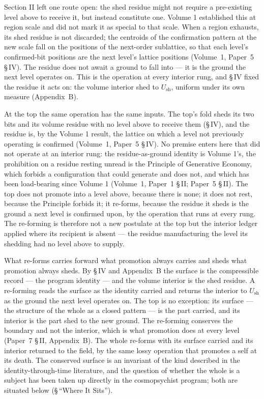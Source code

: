 \documentclass[11pt,oneside]{report}
\theoremstyle{definition}
\theoremstyle{remark}
\begin{document}
Section II left one route open: the shed residue might not require a pre-existing level above to
receive it, but instead constitute one. Volume 1 established this at region scale and did not mark
it as special to that scale. When a region exhausts, its shed residue is not discarded; the
centroids of the confirmation pattern at the new scale fall on the positions of the next-order
sublattice, so that each level's confirmed-bit positions are the next level's lattice positions
(Volume~1, Paper~5 \S\,IV). The residue does not await a ground to fall into --- it is the ground
the next level operates on. This is the operation at every interior rung, and \S\,IV fixed the
residue it acts on: the volume interior shed to \ensuremath{U_{\mathrm{sh}}}, uniform under its own
measure (Appendix~B).

At the top the same operation has the same inputs. The top's fold sheds its two bits and its volume
residue with no level above to receive them (\S\,IV), and the residue is, by the Volume 1 result,
the lattice on which a level not previously operating is confirmed (Volume~1, Paper~5 \S\,IV). No
premise enters here that did not operate at an interior rung: the residue-as-ground identity is
Volume 1's, the prohibition on a residue resting unread is the Principle of Generative Economy,
which forbids a configuration that could generate and does not, and which has been load-bearing
since Volume 1 (Volume~1, Paper~1 \S\,II; Paper~5 \S\,II). The top does not promote into a level
above, because there is none; it does not rest, because the Principle forbids it; it re-forms,
because the residue it sheds is the ground a next level is confirmed upon, by the operation that
runs at every rung. The re-forming is therefore not a new postulate at the top but the interior
ledger applied where its recipient is absent --- the residue manufacturing the level its shedding
had no level above to supply.

What re-forms carries forward what promotion always carries and sheds what promotion always sheds.
By \S\,IV and Appendix~B the surface is the compressible record --- the program identity --- and the
volume interior is the shed residue. A re-forming reads the surface as the identity carried and
returns the interior to \ensuremath{U_{\mathrm{sh}}} as the ground the next level operates on. The
top is no exception: its surface --- the structure of the whole as a closed pattern --- is the part
carried, and its interior is the part shed to the new ground. The re-forming conserves the boundary
and not the interior, which is what promotion does at every level (Paper~7 \S\,II, Appendix~B). The
whole re-forms with its surface carried and its interior returned to the field, by the same lossy
operation that promotes a self at its death. The conserved surface is an invariant of the kind described in the identity-through-time literature, and the question of whether the whole is a subject has been taken up directly in the cosmopsychist program; both are situated below (\S\,``Where It Sits'').
\end{document}
